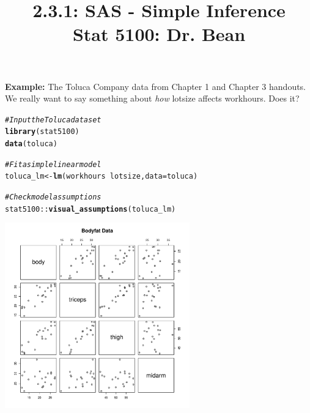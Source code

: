\documentclass{article}\usepackage[]{graphicx}\usepackage[]{color}
\makeatletter
\newcommand{\hlcom}[1]{\textcolor[rgb]{0.678,0.584,0.686}{\textit{#1}}}%
\newcommand{\hlopt}[1]{\textcolor[rgb]{0,0,0}{#1}}%
\newcommand{\hlstd}[1]{\textcolor[rgb]{0.345,0.345,0.345}{#1}}%
\newcommand{\hlkwb}[1]{\textcolor[rgb]{0.69,0.353,0.396}{#1}}%
\newcommand{\hlkwc}[1]{\textcolor[rgb]{0.333,0.667,0.333}{#1}}%
\newcommand{\hlkwd}[1]{\textcolor[rgb]{0.737,0.353,0.396}{\textbf{#1}}}%
\newenvironment{kframe}{%
 \def\at@end@of@kframe{}%
 \ifinner\ifhmode%
  \def\at@end@of@kframe{\end{minipage}}%
  \begin{minipage}{\columnwidth}%
 \fi\fi%
 \def\FrameCommand##1{\hskip\@totalleftmargin \hskip-\fboxsep
 \colorbox{shadecolor}{##1}\hskip-\fboxsep
     \hskip-\linewidth \hskip-\@totalleftmargin \hskip\columnwidth}%
 \MakeFramed {\advance\hsize-\width
   \@totalleftmargin\z@ \linewidth\hsize
   \@setminipage}}%
 {\par\unskip\endMakeFramed%
 \at@end@of@kframe}
\newenvironment{knitrout}{}{} %
\makeatother
\begin{document}
\title{%
  2.3.1: SAS - Simple Inference \\
  \smallskip
  \large Stat 5100: Dr. Bean
}
\date{}

\maketitle

\textbf{Example: } The Toluca Company data from Chapter 1 and Chapter 3 handouts. We really want to say something about \textit{how} lotsize affects workhours. Does it?

\begin{knitrout}
\color{fgcolor}\begin{kframe}
\begin{alltt}
\hlcom{#Input the Toluca dataset}
\hlkwd{library}\hlstd{(stat5100)}
\hlkwd{data}\hlstd{(toluca)}

\hlcom{# Fit a simple linear model}
\hlstd{toluca_lm} \hlkwb{<-} \hlkwd{lm}\hlstd{(workhours} \hlopt{~} \hlstd{lotsize,} \hlkwc{data} \hlstd{= toluca)}

\hlcom{# Check model assumptions}
\hlstd{stat5100}\hlopt{::}\hlkwd{visual_assumptions}\hlstd{(toluca_lm)}
\end{alltt}
\end{kframe}

{\centering \includegraphics[width=0.6\textwidth]{figure/unnamed-chunk-1-1} 

}



\end{knitrout}
\end{document}
